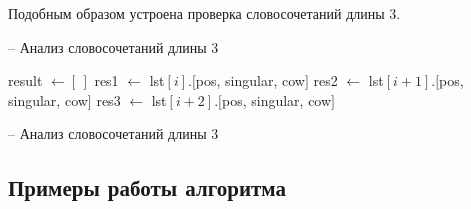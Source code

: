 \documentclass[main]{subfiles}
\begin{document}
Подобным образом устроена проверка словосочетаний длины 3.

\begin{algorithm}[!h]
	\caption{-- Анализ словосочетаний длины 3}\label{alg26}
	\begin{algorithmic}[1]
		\State result $\gets [\, ]$ 
		\State res1 $\gets$ lst$[i]$.$[$pos, singular, cow$]$
		\State res2 $\gets$ lst$[i + 1]$.$[$pos, singular, cow$]$
		\State res3 $\gets$ lst$[i + 2]$.$[$pos, singular, cow$]$
		\For{}
		\For{}
		\For{}
		\EndFor
		\EndFor
		\EndFor
	\end{algorithmic}
\end{algorithm}
\pagebreak

\begin{algorithm}
	\caption{-- Анализ словосочетаний длины 3}\label{alg26}
	\begin{algorithmic}[1]
		\algrestore{bkbreak}
		
		\EndFor
		\EndFunction
	\end{algorithmic}
\end{algorithm}
\subsection{Примеры работы алгоритма}
\end{document}
